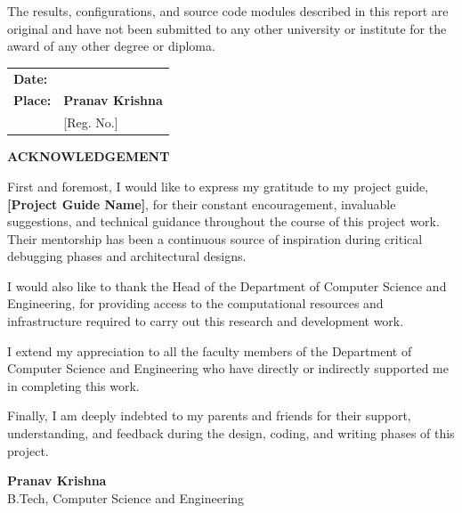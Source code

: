 \documentclass[12pt,a4paper]{report}
\begin{document}
The results, configurations, and source code modules described in this report are original and have not been submitted to any other university or institute for the award of any other degree or diploma.

\vspace{4cm}
\noindent
\begin{tabular}{@{}p{3.5in}p{2.5in}@{}}
    \textbf{Date:} \hrulefill & \hrulefill \\
    \textbf{Place:} \hrulefill & \textbf{Pranav Krishna} \\
     & [Reg. No.]
\end{tabular}

\newpage
\thispagestyle{empty}
\begin{center}
    \large
    \textbf{ACKNOWLEDGEMENT}
\end{center}
\vspace{1.5cm}
First and foremost, I would like to express my gratitude to my project guide, \textbf{[Project Guide Name]}, for their constant encouragement, invaluable suggestions, and technical guidance throughout the course of this project work. Their mentorship has been a continuous source of inspiration during critical debugging phases and architectural designs.

I would also like to thank the Head of the Department of Computer Science and Engineering, for providing access to the computational resources and infrastructure required to carry out this research and development work.

I extend my appreciation to all the faculty members of the Department of Computer Science and Engineering who have directly or indirectly supported me in completing this work.

Finally, I am deeply indebted to my parents and friends for their support, understanding, and feedback during the design, coding, and writing phases of this project.

\vspace{3cm}
\noindent
\textbf{Pranav Krishna} \\
B.Tech, Computer Science and Engineering \\
[University/College Name]
\end{document}
